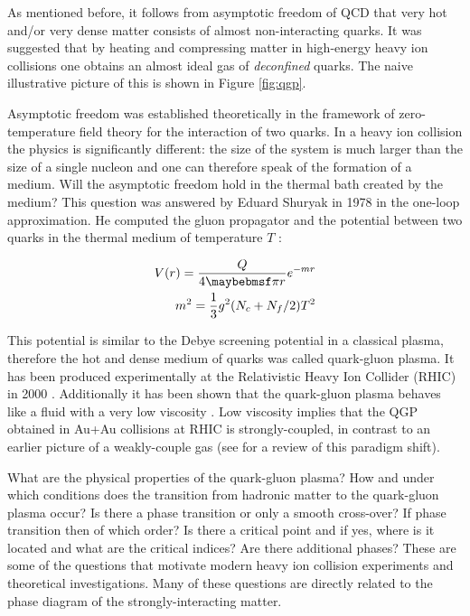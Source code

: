 As mentioned before, it follows from asymptotic freedom of QCD that very hot
and/or very dense matter consists of almost non-interacting quarks. It
was suggested \cite{Collins:1974ky} that by heating and compressing matter in
high-energy heavy ion collisions one obtains an almost ideal gas of
\emph{deconfined} quarks. The naive illustrative picture of this is shown in
Figure \ref{fig:qgp}.

Asymptotic freedom was established theoretically in the framework of 
zero-temperature field theory for the interaction of two quarks. In a heavy ion
collision the physics is significantly different: the size of the system is much
larger than the size of a single nucleon and one can therefore speak of the formation
of a medium. Will the asymptotic freedom hold in the thermal bath created
by the medium? This question was answered by Eduard Shuryak in 1978 in the
one-loop approximation. He computed the gluon propagator and the potential
between two quarks in the thermal medium of temperature $T$ \cite{Shuryak:1977ut}:

\begin{align}
  V(r) = \frac{Q}{4 \pi r} \eexp{-m r} \\
  m^2 = \frac{1}{3} g^2 (N_c + N_f/2) T^2
\end{align}

This potential is similar to the Debye screening potential in a classical plasma,
therefore the hot and dense medium of quarks was called quark-gluon plasma.  It has
been produced experimentally at the Relativistic Heavy Ion Collider (RHIC) in 2000
\cite{Adams:2005dq,Adcox:2004mh,Arsene:2004fa,Back:2004je}.
Additionally it has been shown that the quark-gluon plasma behaves like a fluid with a
very low viscosity \cite{Song:2007ux,Dusling:2007gi,Romatschke:2007mq}. Low viscosity
implies that the QGP obtained in Au+Au collisions at RHIC is strongly-coupled, in
contrast to an earlier picture of a weakly-couple gas (see \cite{Shuryak:2008eq} for
a review of this paradigm shift).

What are the physical properties of the quark-gluon plasma? How and under which
conditions does the transition from hadronic matter to the quark-gluon plasma occur?
Is there a phase transition or only a smooth cross-over? If phase transition then of
which order? Is there a critical point and if yes, where is it located and what are
the critical indices? Are there additional phases? These are some of the
questions that motivate modern heavy ion collision experiments and theoretical
investigations. Many of these questions are directly related to the phase
diagram of the strongly-interacting matter.

